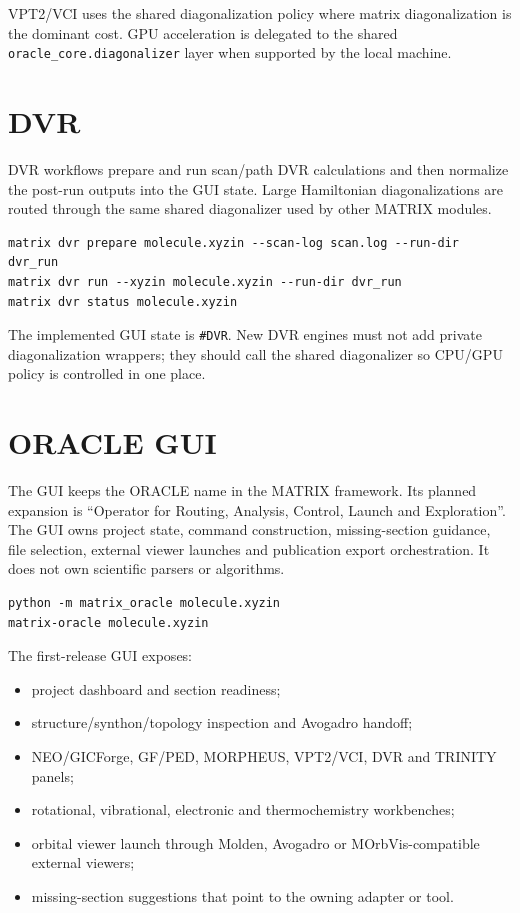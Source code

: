 \documentclass[11pt]{article}
\newcommand{\sectionname}[1]{\texttt{\##1}}
\begin{document}
VPT2/VCI uses the shared diagonalization policy where matrix diagonalization is
the dominant cost.  GPU acceleration is delegated to the shared
\texttt{oracle\_core.diagonalizer} layer when supported by the local machine.

\section{DVR}

DVR workflows prepare and run scan/path DVR calculations and then normalize the
post-run outputs into the GUI state.  Large Hamiltonian diagonalizations are
routed through the same shared diagonalizer used by other MATRIX modules.

\begin{lstlisting}[style=matrix]
matrix dvr prepare molecule.xyzin --scan-log scan.log --run-dir dvr_run
matrix dvr run --xyzin molecule.xyzin --run-dir dvr_run
matrix dvr status molecule.xyzin
\end{lstlisting}

The implemented GUI state is \sectionname{DVR}.  New DVR engines must not add
private diagonalization wrappers; they should call the shared diagonalizer so
CPU/GPU policy is controlled in one place.

\section{ORACLE GUI}

The GUI keeps the ORACLE name in the MATRIX framework.  Its planned expansion
is ``Operator for Routing, Analysis, Control, Launch and Exploration''.  The
GUI owns project state, command construction, missing-section guidance, file
selection, external viewer launches and publication export orchestration.  It
does not own scientific parsers or algorithms.

\begin{lstlisting}[style=matrix]
python -m matrix_oracle molecule.xyzin
matrix-oracle molecule.xyzin
\end{lstlisting}

The first-release GUI exposes:

\begin{itemize}
  \item project dashboard and section readiness;
  \item structure/synthon/topology inspection and Avogadro handoff;
  \item NEO/GICForge, GF/PED, MORPHEUS, VPT2/VCI, DVR and TRINITY panels;
  \item rotational, vibrational, electronic and thermochemistry workbenches;
  \item orbital viewer launch through Molden, Avogadro or MOrbVis-compatible
        external viewers;
  \item missing-section suggestions that point to the owning adapter or tool.
\end{itemize}
\end{document}
